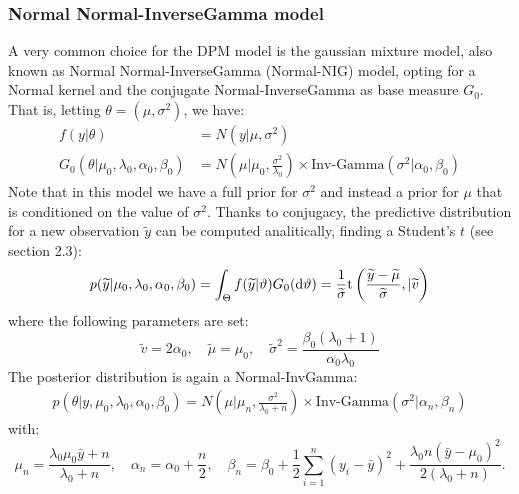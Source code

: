 \subsubsection{Normal Normal-InverseGamma model} \label{nnig}
A very common choice for the DPM model is the gaussian mixture model, also known as Normal Normal-InverseGamma (Normal-NIG) model, opting for a Normal kernel and the conjugate Normal-InverseGamma as base measure $G_0$. That is, letting $\theta=(\mu,\sigma^2)$, we have:
\begin{equation}
	\begin{aligned}
		f(y|\theta)&=N(y| \mu ,\sigma^2)  \\
		G_0(\theta|\mu_0,\lambda_0, \alpha_0, 	\beta_0)
		&=N\left(\mu | \mu_0 ,\frac{\sigma^2} {\lambda_0}\right) \times \text{Inv-Gamma}(\sigma^2|\alpha_0, \beta_0 )
	\end{aligned}
\end{equation}
Note that in this model we have a full prior for $\sigma^2$ and instead a prior for $\mu$ that is conditioned on the value of $\sigma^2$.
Thanks to conjugacy, the predictive distribution for a new observation $\widetilde{y}$ can be computed analitically, finding a Student's $t$ (see \cite{integral} section 2.3):
\begin{align*}
	p(\widetilde{y}|\mu_0,\lambda_0, \alpha_0, \beta_0)= \int_\Theta f(\widetilde{y}|\vartheta)G_0(\mathrm d\vartheta)= \frac{1}{\widetilde{\sigma}} \text{t}\left(\frac{\widetilde{y}-\widetilde{\mu}}{\widetilde{\sigma}} ,|\widetilde{v}\right)        	
\end{align*}
where the following parameters are set:
$$
	\widetilde{v}=2 \alpha_0, \quad
	\widetilde{\mu}=\mu_0, \quad
	\widetilde{\sigma}^2= \frac{\beta_0(\lambda_0+1)}{\alpha_0 \lambda_0}
$$
The posterior distribution is again a Normal-InvGamma:
\begin{align*}
	p(\theta|y,\mu_0,\lambda_0, \alpha_0, \beta_0)=N\left(\mu | \mu_n ,\frac{\sigma^2} {\lambda_0 + n}\right) \times \text{Inv-Gamma}(\sigma^2|\alpha_n, \beta_n )
\end{align*}
with:
$$
\mu_n=\frac{\lambda_0 \mu_0 \bar{y} + n}{\lambda_0 + n}, \quad \alpha_n= \alpha_0 + \frac{n}{2}, \quad \beta_n= \beta_0 + \frac{1}{2}\sum_{i=1}^{n} (y_i-\bar{y})^2 + \frac{\lambda_0 n(\bar{y}-\mu_0)^2}{2(\lambda_0 + n)}.
$$
